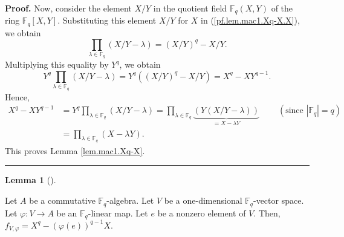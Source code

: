 \documentclass[numbers=enddot,12pt,final,onecolumn,notitlepage]{scrartcl}%
\theoremstyle{definition}
\newtheorem{lem}[theo]{Lemma}
\newenvironment{lemma}[1][]
{\begin{lem}[#1]\begin{leftbar}}
{\end{leftbar}\end{lem}}
\newenvironment{proof}[1][Proof]{\noindent\textbf{#1.} }{\ \rule{0.5em}{0.5em}}
\let\prodnonlimits\prod
\renewcommand{\prod}{\prodnonlimits\limits}
\begin{document}
\begin{proof}
Now, consider the element $X/Y$ in the quotient field $\mathbb{F}_{q}\left(
X,Y\right)  $ of the ring $\mathbb{F}_{q}\left[  X,Y\right]  $. Substituting
this element $X/Y$ for $X$ in (\ref{pf.lem.mac1.Xq-X.X}), we obtain%
\[
\prod_{\lambda\in\mathbb{F}_{q}}\left(  X/Y-\lambda\right)  =\left(
X/Y\right)  ^{q}-X/Y.
\]
Multiplying this equality by $Y^{q}$, we obtain%
\[
Y^{q}\prod_{\lambda\in\mathbb{F}_{q}}\left(  X/Y-\lambda\right)  =Y^{q}\left(
\left(  X/Y\right)  ^{q}-X/Y\right)  =X^{q}-XY^{q-1}.
\]
Hence,
\begin{align*}
X^{q}-XY^{q-1}  &  =Y^{q}\prod_{\lambda\in\mathbb{F}_{q}}\left(
X/Y-\lambda\right)  =\prod_{\lambda\in\mathbb{F}_{q}}\underbrace{\left(
Y\left(  X/Y-\lambda\right)  \right)  }_{=X-\lambda Y}%
\ \ \ \ \ \ \ \ \ \ \left(  \text{since }\left\vert \mathbb{F}_{q}\right\vert
=q\right) \\
&  =\prod_{\lambda\in\mathbb{F}_{q}}\left(  X-\lambda Y\right)  .
\end{align*}
This proves Lemma \ref{lem.mac1.Xq-X}.
\end{proof}

\begin{lemma}
\label{lem.mac1.dim1}Let $A$ be a commutative $\mathbb{F}_{q}$-algebra. Let
$V$ be a one-dimensional $\mathbb{F}_{q}$-vector space. Let $\varphi
:V\rightarrow A$ be an $\mathbb{F}_{q}$-linear map. Let $e$ be a nonzero
element of $V$. Then, $f_{V,\varphi}=X^{q}-\left(  \varphi\left(  e\right)
\right)  ^{q-1}X$.
\end{lemma}
\end{document}
